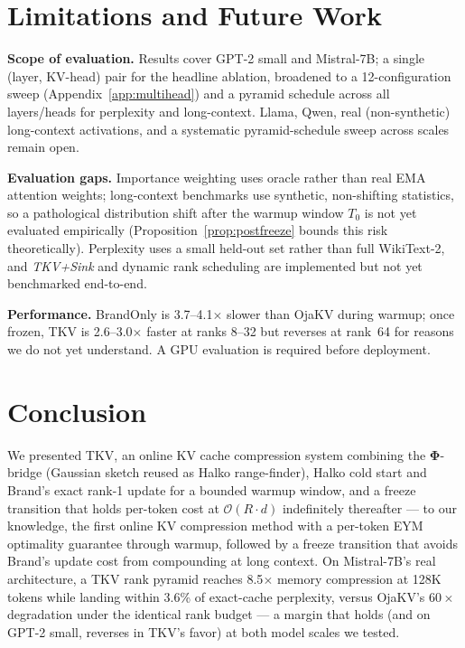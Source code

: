 \documentclass{article}
\let\PhiSymbol\Phi
\renewcommand{\Phi}{\boldsymbol{\PhiSymbol}}
\begin{document}
\section{Limitations and Future Work}
\label{sec:limitations}

\textbf{Scope of evaluation.}  Results cover GPT-2 small and Mistral-7B; a
single (layer, KV-head) pair for the headline ablation, broadened to a
12-configuration sweep (Appendix~\ref{app:multihead}) and a pyramid
schedule across all layers/heads for perplexity and long-context.  Llama,
Qwen, real (non-synthetic) long-context activations, and a systematic
pyramid-schedule sweep across scales remain open.

\textbf{Evaluation gaps.}  Importance weighting uses oracle rather than
real EMA attention weights; long-context benchmarks use synthetic,
non-shifting statistics, so a pathological distribution shift after the
warmup window $T_0$ is not yet evaluated empirically
(Proposition~\ref{prop:postfreeze} bounds this risk theoretically).
Perplexity uses a small held-out set rather than full WikiText-2, and
\emph{TKV+Sink} and dynamic rank scheduling are implemented but not yet
benchmarked end-to-end.

\textbf{Performance.}  BrandOnly is 3.7--4.1$\times$ slower than OjaKV
during warmup; once frozen, TKV is 2.6--3.0$\times$ faster at ranks 8--32
but reverses at rank~64 for reasons we do not yet understand.  A GPU
evaluation is required before deployment.

\section{Conclusion}

We presented TKV, an online KV cache compression system combining the
$\Phi$-bridge (Gaussian sketch reused as Halko range-finder), Halko cold
start and Brand's exact rank-1 update for a bounded warmup window, and a
freeze transition that holds per-token cost at $\mathcal{O}(R{\cdot}d)$
indefinitely thereafter --- to our knowledge, the first online KV
compression method with a per-token EYM optimality guarantee through
warmup, followed by a freeze transition that avoids Brand's update cost
from compounding at long context.  On Mistral-7B's real architecture, a TKV
rank pyramid reaches 8.5$\times$ memory compression at 128K tokens while
landing within 3.6\% of exact-cache perplexity, versus OjaKV's $60\times$
degradation under the identical rank budget --- a margin that holds (and on
GPT-2 small, reverses in TKV's favor) at both model scales we tested.
\end{document}

